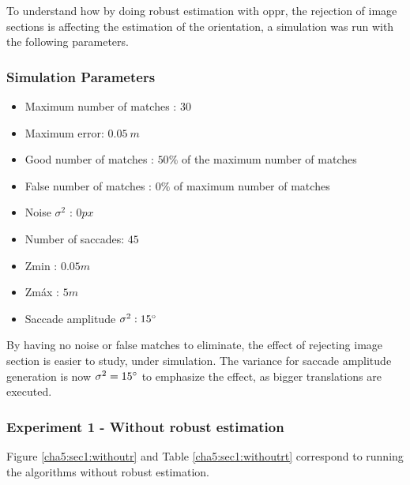 To understand how by doing robust estimation with \acrshort{oppr}, the rejection of image sections is affecting the estimation of the orientation, a simulation was run with the following parameters.

\subsubsection{Simulation Parameters}
\begin{itemize}
	\item Maximum number of matches : $30$
	\item Maximum error: $0.05 \ m$
	\item Good number of matches : $50 \%$ of the maximum number of matches
	\item False number of matches : $0 \%$ of maximum number of matches
	\item Noise $\sigma^2$ : $0 px$
	\item Number of saccades: $45$
	\item Zmin : $0.05 m$
	\item Zmáx : $5 m$
	\item Saccade amplitude $\sigma^2 : 15 \degree $
\end{itemize}

By having no noise or false matches to eliminate, the effect of rejecting image section is easier to study, under simulation. The variance for saccade amplitude generation is now $\sigma^2 = 15 \degree $ to emphasize the effect, as bigger translations are executed.

\subsubsection{Experiment 1 - Without robust estimation}
Figure \ref{cha5:sec1:withoutr} and Table \ref{cha5:sec1:withoutrt} correspond to running the algorithms without robust estimation.\\

